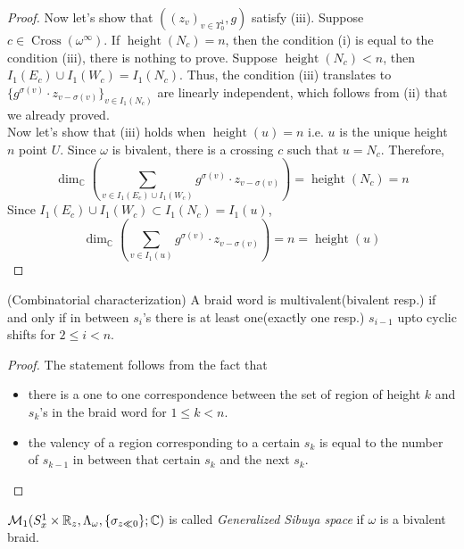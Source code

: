 \begin{proof}
Now let's show that $((z_v)_{v\in\Upsilon_0^1},g)$ satisfy (\Rn{3}). Suppose $c\in \operatorname{Cross}(\omega^\infty)$. If $\operatorname{height}(N_c)=n$, then the condition (\Rn{1}) is equal to the condition (\Rn{3}), there is nothing to prove. Suppose $\operatorname{height}(N_c)<n$, then $I_1(E_c)\cup I_1(W_c)=I_1(N_c)$. Thus, the condition (\Rn{3}) translates to $\{g^{\sigma(v)}\cdot z_{v-\sigma(v)}\}_{v\in I_1(N_c)}$ are linearly independent, which follows from (\Rn{2}) that we already proved.\\
Now let's show that (\Rn{3}) holds when $\operatorname{height}(u)=n$ i.e. $u$ is the unique height $n$ point $U$. Since $\omega$ is bivalent, there is a crossing $c$ such that $u=N_c$. Therefore,
\[
\operatorname{dim}_\mathbb{C}(\sum_{v\in I_1(E_c)\cup I_1(W_c)} g^{\sigma(v)}\cdot z_{v-\sigma(v)}) = \operatorname{height}(N_c) = n
\]
Since $I_1(E_c)\cup I_1(W_c)\subset I_1(N_c)=I_1(u)$, 
\[
\operatorname{dim}_\mathbb{C}(\sum_{v\in I_1(u)} g^{\sigma(v)}\cdot z_{v-\sigma(v)}) = n=\operatorname{height}(u)
\]
\end{proof}

\begin{theorem}\label{combinatorial}
(Combinatorial characterization) A braid word is multivalent(bivalent resp.) if and only if in between $s_i$'s there is at least one(exactly one resp.) $s_{i-1}$ upto cyclic shifts for $2\leq i<n$.
\end{theorem}
\begin{proof}
The statement follows from the fact that 
\begin{itemize}
\item there is a one to one correspondence between the set of region of height $k$ and $s_k$'s in the braid word for $1\leq k<n$.

\item the valency of a region corresponding to a certain $s_k$ is equal to the number of $s_{k-1}$ in between that certain $s_k$ and the next $s_k$.
\end{itemize}
\end{proof}

\begin{definition}
$\mathcal{M}_1(S^1_x \times \mathbb{R}_z,\Lambda_\omega,\{\sigma_{z\ll 0}\};\mathbb{C})$ is called \emph{Generalized Sibuya space} if $\omega$ is a bivalent braid.
\end{definition}

   
